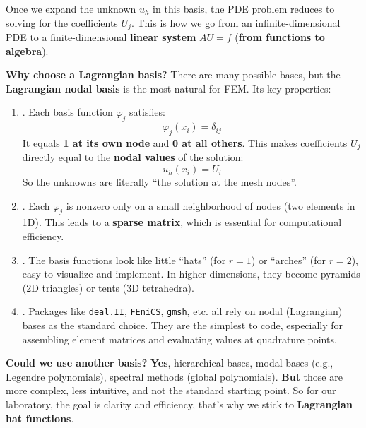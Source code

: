 \highspace
Once we expand the unknown $u_{h}$ in this basis, the PDE problem reduces to solving for the coefficients $U_{j}$. This is how we go from an infinite-dimensional PDE to a finite-dimensional \textbf{linear system} $AU = f$ (\textbf{from functions to algebra}).

\highspace
\textcolor{Green3}{ \textbf{Why choose a Lagrangian basis?}} There are many possible bases, but the \textbf{Lagrangian nodal basis} is the most natural for FEM. Its key properties:
\begin{enumerate}
    \item {}. Each basis function $\varphi_j$ satisfies:
    \begin{equation*}
        \varphi_j(x_i) = \delta_{ij}
    \end{equation*}
    It equals \textbf{1 at its own node} and \textbf{0 at all others}. This makes coefficients $U_j$ directly equal to the \textbf{nodal values} of the solution:
    \begin{equation*}
        u_h(x_i) = U_i
    \end{equation*}
    So the unknowns are literally ``the solution at the mesh nodes''.
    
    \item {}. Each $\varphi_j$ is nonzero only on a small neighborhood of nodes (two elements in 1D). This leads to a \textbf{sparse matrix}, which is essential for computational efficiency.

    \item {}. The basis functions look like little ``hats'' (for $r=1$) or ``arches'' (for $r=2$), easy to visualize and implement. In higher dimensions, they become pyramids (2D triangles) or tents (3D tetrahedra).

    \item {}. Packages like \texttt{deal.II}, \texttt{FEniCS}, \texttt{gmsh}, etc. all rely on nodal (Lagrangian) bases as the standard choice. They are the simplest to code, especially for assembling element matrices and evaluating values at quadrature points.
\end{enumerate}
\textcolor{Green3}{ \textbf{Could we use another basis?}} \textbf{Yes}, hierarchical bases, modal bases (e.g., Legendre polynomials), spectral methods (global polynomials). \textbf{But} those are more complex, less intuitive, and not the standard starting point. So for our laboratory, the goal is clarity and efficiency, that's why we stick to \textbf{Lagrangian hat functions}.

